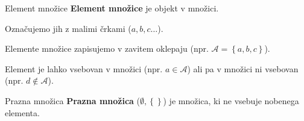         \begin{frame}
            \begin{alertblock}{Element množice}
            \textbf{Element množice} je objekt v množici. 
            \end{alertblock}
            \begin{block}{}
                Označujemo jih z malimi črkami ($a, b, c \dots$). 
            \end{block} 

            \begin{block}{}
                Elemente množice zapisujemo v zavitem oklepaju (npr. $\mathcal{A}=\left\{a, b, c\right\}$).
            \end{block}

            \begin{block}{}
                Element je lahko vsebovan v množici (npr. $a\in\mathcal{A}$) ali pa 
                v množici ni vsebovan (npr. $d\notin\mathcal{A}$).
            \end{block} 

            \begin{alertblock}{Prazna množica}
                \textbf{Prazna množica} ($\mathbf{\emptyset, \left\{\right\}}$) je množica, 
                ki ne vsebuje nobenega elementa.
                
            \end{alertblock}

        \end{frame}

